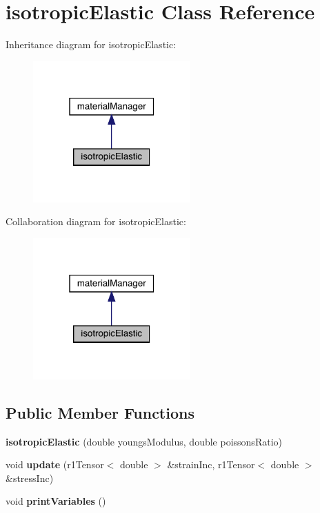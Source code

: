 \hypertarget{classisotropic_elastic}{}\section{isotropic\+Elastic Class Reference}
\label{classisotropic_elastic}


Inheritance diagram for isotropic\+Elastic\+:\nopagebreak
\begin{figure}[H]
\begin{center}
\leavevmode
\includegraphics[width=171pt]{classisotropic_elastic__inherit__graph}
\end{center}
\end{figure}


Collaboration diagram for isotropic\+Elastic\+:\nopagebreak
\begin{figure}[H]
\begin{center}
\leavevmode
\includegraphics[width=171pt]{classisotropic_elastic__coll__graph}
\end{center}
\end{figure}
\subsection*{Public Member Functions}
\begin{DoxyCompactItemize}
\item 
\mbox{\label{classisotropic_elastic_ab3b2f2897d0174e6b7feb44bbc498699}} 
{\bfseries isotropic\+Elastic} (double youngs\+Modulus, double poissons\+Ratio)
\item 
\mbox{\label{classisotropic_elastic_aa92c83e227328632cc01bf9223b95805}} 
void {\bfseries update} (r1\+Tensor$<$ double $>$ \&strain\+Inc, r1\+Tensor$<$ double $>$ \&stress\+Inc)
\item 
\mbox{\label{classisotropic_elastic_aced4646179b73c77af191c6716ea32d0}} 
void {\bfseries print\+Variables} ()
\end{DoxyCompactItemize}


